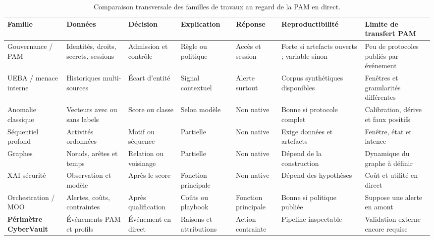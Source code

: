 \documentclass[11pt,a4paper,oneside]{report}
\theoremstyle{definition}
\theoremstyle{plain}
\begin{document}
\begin{table}[htbp]
\centering
\caption{Comparaison transversale des familles de travaux au regard de la PAM en direct.}
\label{tab:domain-transversal}
\scriptsize
\begin{tabular}{@{}p{2.25cm}p{2.25cm}p{1.75cm}p{1.75cm}p{1.65cm}p{1.7cm}p{2.05cm}@{}}
\toprule
\textbf{Famille} & \textbf{Données} & \textbf{Décision} & \textbf{Explication} & \textbf{Réponse} & \textbf{Reproductibilité} & \textbf{Limite de transfert PAM} \\
\midrule
Gouvernance / PAM~\cite{ref1,ref2,ref5,ref16,ref17,ref18}
& Identités, droits, secrets, sessions & Admission et contrôle & Règle ou politique & Accès et session & Forte si artefacts ouverts ; variable sinon & Peu de protocoles publiés par événement \\
UEBA / menace interne~\cite{ref6,ref24,ref27,ref32,ref40}
& Historiques multi-sources & Écart d'entité & Signal contextuel & Alerte surtout & Corpus synthétiques disponibles & Fenêtres et granularités différentes \\
Anomalie classique~\cite{ref8,ref19,ref20,ref30,ref48}
& Vecteurs avec ou sans labels & Score ou classe & Selon modèle & Non native & Bonne si protocole complet & Calibration, dérive et faux positifs \\
Séquentiel profond~\cite{ref10,ref31,ref44}
& Activités ordonnées & Motif ou séquence & Partielle & Non native & Exige données et artefacts & Fenêtre, état et latence \\
Graphes~\cite{ref23}
& Nœuds, arêtes et temps & Relation ou voisinage & Partielle & Non native & Dépend de la construction & Dynamique du graphe à définir \\
XAI sécurité~\cite{ref12,ref13,ref25}
& Observation et modèle & Après le score & Fonction principale & Non native & Dépend des hypothèses & Coût et utilité en direct \\
Orchestration / MOO~\cite{ref15,ref33,ref38,ref39,ref41}
& Alertes, coûts, contraintes & Après qualification & Coûts ou playbook & Fonction principale & Bonne si politique publiée & Suppose une alerte en amont \\
\textbf{Périmètre CyberVault}
& Événements PAM et profils & Événement en direct & Raisons et attributions & Action contrainte & Pipeline inspectable & Validation externe encore requise \\
\bottomrule
\end{tabular}
\end{table}
\end{document}
